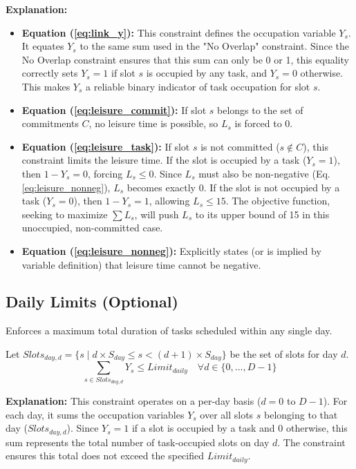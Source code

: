 \documentclass{article}
\begin{document}
\textbf{Explanation:}
\begin{itemize}
    \item \textbf{Equation (\ref{eq:link_y}):} This constraint defines the occupation variable $Y_s$. It equates $Y_s$ to the same sum used in the "No Overlap" constraint. Since the No Overlap constraint ensures that this sum can only be 0 or 1, this equality correctly sets $Y_s = 1$ if slot $s$ is occupied by any task, and $Y_s = 0$ otherwise. This makes $Y_s$ a reliable binary indicator of task occupation for slot $s$.
    \item \textbf{Equation (\ref{eq:leisure_commit}):} If slot $s$ belongs to the set of commitments $C$, no leisure time is possible, so $L_s$ is forced to 0.
    \item \textbf{Equation (\ref{eq:leisure_task}):} If slot $s$ is not committed ($s \notin C$), this constraint limits the leisure time. If the slot is occupied by a task ($Y_s = 1$), then $1 - Y_s = 0$, forcing $L_s \le 0$. Since $L_s$ must also be non-negative (Eq. \ref{eq:leisure_nonneg}), $L_s$ becomes exactly 0. If the slot is not occupied by a task ($Y_s = 0$), then $1 - Y_s = 1$, allowing $L_s \le 15$. The objective function, seeking to maximize $\sum L_s$, will push $L_s$ to its upper bound of 15 in this unoccupied, non-committed case.
    \item \textbf{Equation (\ref{eq:leisure_nonneg}):} Explicitly states (or is implied by variable definition) that leisure time cannot be negative.
\end{itemize}

\subsection{Daily Limits (Optional)}
Enforces a maximum total duration of tasks scheduled within any single day.

Let $Slots_{day, d} = \{s \mid d \times S_{day} \le s < (d+1) \times S_{day}\}$ be the set of slots for day $d$.
\[
\sum_{s \in Slots_{day, d}} Y_s \le Limit_{daily} \quad \forall d \in \{0, ..., D-1\}
\]

\textbf{Explanation:} This constraint operates on a per-day basis ($d=0$ to $D-1$). For each day, it sums the occupation variables $Y_s$ over all slots $s$ belonging to that day ($Slots_{day, d}$). Since $Y_s=1$ if a slot is occupied by a task and 0 otherwise, this sum represents the total number of task-occupied slots on day $d$. The constraint ensures this total does not exceed the specified $Limit_{daily}$.
\end{document}
